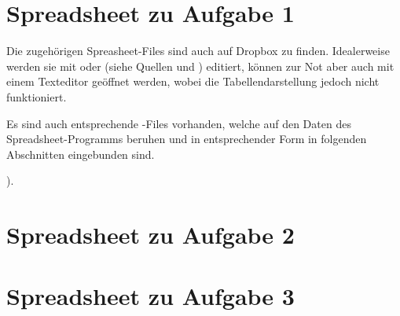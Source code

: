 \section{Spreadsheet zu Aufgabe 1}

Die    zugeh\"origen   Spreasheet-Files    sind    auch    auf   Dropbox    zu
finden. Idealerweise werden sie mit  oder  (siehe Quellen
\cite{ref:scim} und  \cite{ref:sc}) editiert, k\"onnen  zur Not aber  auch mit
einem Texteditor ge\"offnet werden, wobei die Tabellendarstellung jedoch nicht
funktioniert.

Es sind auch entsprechende -Files  vorhanden, welche auf den Daten
des  Spreadsheet-Programms beruhen  und  in entsprechender  Form in  folgenden
Abschnitten eingebunden sind.


\label{appendix:aufgabe1}
).


\clearpage
\section{Spreadsheet zu Aufgabe 2}
\label{appendix:aufgabe2}


\clearpage
\section{Spreadsheet zu Aufgabe 3}
\label{appendix:aufgabe3}

